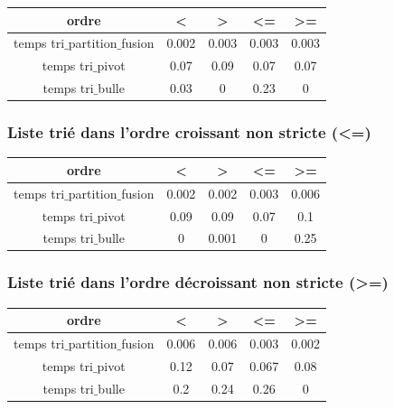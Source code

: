 \documentclass[a4paper, 12pt]{article}
\begin{document}
\begin{center}
\begin{tabular}{|c|c|c|c|c|}
\hline 
ordre & < & > & <= & >= \\ 
\hline 
temps tri$\_$partition$\_$fusion & 0.002 & 0.003 &0.003 & 0.003 \\ 
\hline 
temps tri$\_$pivot & 0.07 & 0.09 & 0.07 & 0.07\\ 
\hline 
temps tri$\_$bulle & 0.03 & 0 & 0.23 & 0 \\ 
\hline  
\end{tabular} 
\end{center}

\subsubsection{Liste trié dans l'ordre croissant non stricte (<=)}

\begin{center}
\begin{tabular}{|c|c|c|c|c|}
\hline 
ordre & < & > & <= & >= \\ 
\hline 
temps tri$\_$partition$\_$fusion & 0.002 & 0.002 &0.003 & 0.006 \\ 
\hline 
temps tri$\_$pivot & 0.09 & 0.09 & 0.07 & 0.1\\ 
\hline 
temps tri$\_$bulle & 0 & 0.001 & 0 & 0.25 \\ 
\hline 
\end{tabular}
\end{center} 

\subsubsection{Liste trié dans l'ordre décroissant non stricte (>=)}

\begin{center}
\begin{tabular}{|c|c|c|c|c|}
\hline 
ordre & < & > & <= & >= \\ 
\hline 
temps tri$\_$partition$\_$fusion & 0.006 & 0.006 &0.003 & 0.002 \\ 
\hline 
temps tri$\_$pivot & 0.12 & 0.07 & 0.067 & 0.08\\ 
\hline 
temps tri$\_$bulle & 0.2 & 0.24 & 0.26 & 0 \\ 
\hline  
\end{tabular}
\end{center} 
\end{document}
